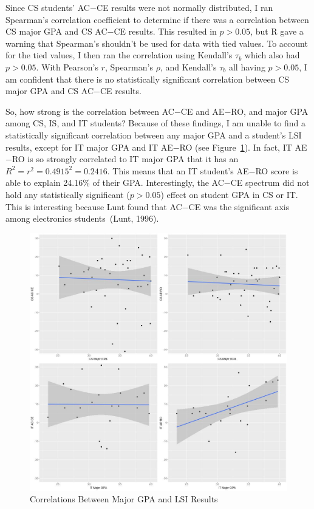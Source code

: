 Since CS students' AC$-$CE results were not normally distributed, I ran Spearman's correlation coefficient to determine if there was a correlation between CS major GPA and CS AC$-$CE results. This resulted in $p>0.05$, but R gave a warning that Spearman's shouldn't be used for data with tied values. To account for the tied values, I then ran the correlation using Kendall's $\tau_b$ which also had $p>0.05$. With Pearson's $r$, Spearman's $\rho$, and Kendall's $\tau_b$ all having $p>0.05$, I am confident that there is no statistically significant correlation between CS major GPA and CS AC$-$CE results.

So, how strong is the correlation between AC$-$CE and AE$-$RO, and major GPA among CS, IS, and IT students? Because of these findings, I am unable to find a statistically significant correlation between any major GPA and a student's LSI results, except for IT major GPA and IT AE$-$RO (see Figure~\ref{fig:major_gpa_lm_plots}). In fact, IT AE$-$RO is so strongly correlated to IT major GPA that it has an $R^2=r^2=0.4915^2=0.2416$. This means that an IT student's AE$-$RO score is able to explain 24.16\% of their GPA. Interestingly, the AC$-$CE spectrum did not hold any statistically significant ($p>0.05$) effect on student GPA in CS or IT. This is interesting because Lunt found that AC$-$CE was the significant axis among electronics students~(Lunt, 1996).

\begin{figure}
  \centering
  \includegraphics[width=1.1\textwidth]{figures/chapter4/major_gpa_lm_plots.jpg}
  \caption{Correlations Between Major GPA and LSI Results}
  \label{fig:major_gpa_lm_plots}
\end{figure}

